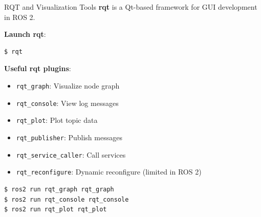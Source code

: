 \begin{frame}[fragile]{RQT and Visualization Tools}
    \textbf{rqt} is a Qt-based framework for GUI development in ROS 2.

    \textbf{Launch rqt}:
    \begin{lstlisting}[language=shell]
$ rqt
\end{lstlisting}

    \textbf{Useful rqt plugins}:
    \begin{itemize}
        \item \texttt{rqt\_graph}: Visualize node graph
        \item \texttt{rqt\_console}: View log messages
        \item \texttt{rqt\_plot}: Plot topic data
        \item \texttt{rqt\_publisher}: Publish messages
        \item \texttt{rqt\_service\_caller}: Call services
        \item \texttt{rqt\_reconfigure}: Dynamic reconfigure (limited in ROS 2)
    \end{itemize}

    \begin{lstlisting}[language=shell]
$ ros2 run rqt_graph rqt_graph
$ ros2 run rqt_console rqt_console
$ ros2 run rqt_plot rqt_plot
\end{lstlisting}
\end{frame}








